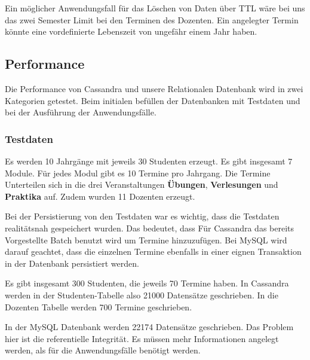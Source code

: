 \vspace{6pt}

Ein möglicher Anwendungsfall für das Löschen von Daten über TTL wäre bei uns das zwei Semester Limit bei den Terminen des Dozenten. Ein angelegter Termin könnte eine vordefinierte Lebenszeit von ungefähr einem Jahr haben.

\newpage

\subsection{Performance}
Die Performance von Cassandra und unsere Relationalen Datenbank wird in zwei Kategorien getestet. Beim initialen befüllen der Datenbanken mit Testdaten und bei der Ausführung der Anwendungsfälle.

\vspace{12pt}

\subsubsection{Testdaten}
Es werden 10 Jahrgänge mit jeweils 30 Studenten erzeugt. Es gibt insgesamt 7 Module. Für jedes Modul gibt es 10 Termine pro Jahrgang. Die Termine Unterteilen sich in die drei Veranstaltungen \textbf{Übungen}, \textbf{Verlesungen} und \textbf{Praktika} auf. Zudem wurden 11 Dozenten erzeugt.

\vspace{6pt}

Bei der Persistierung von den Testdaten war es wichtig, dass die Testdaten realitätsnah gespeichert wurden. Das bedeutet, dass Für Cassandra das bereits Vorgestellte Batch benutzt wird um Termine hinzuzufügen. Bei MySQL wird darauf geachtet, dass die einzelnen Termine ebenfalls in einer eignen Transaktion in der Datenbank persistiert werden.

\vspace{6pt}

Es gibt insgesamt 300 Studenten, die jeweils 70 Termine haben. In Cassandra werden in der Studenten-Tabelle also 21000 Datensätze geschrieben. In die Dozenten Tabelle werden 700 Termine geschrieben.

\vspace{6pt}

In der MySQL Datenbank werden 22174 Datensätze geschrieben. Das Problem hier ist die referentielle Integrität. Es müssen mehr Informationen angelegt werden, als für die Anwendungsfälle benötigt werden.

\vspace{6pt}

